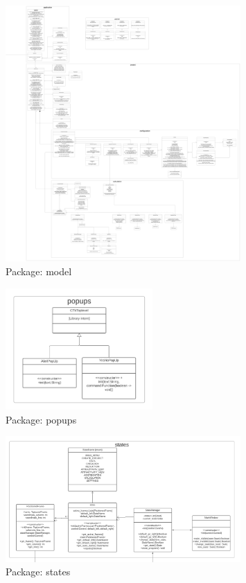 \documentclass[parskip=full]{scrartcl} %
\begin{document}
\hypertarget{model}{
\begin{figure}[hbt!]
  \centering
\includegraphics[width=0.8\textwidth]
        {pictures/model.png}
  \caption{Package: model}
  \label{fig:mvc}
\end{figure}
}

\hypertarget{popups}{
\begin{figure}[hbt!]
  \centering
\includegraphics[width=0.5\textwidth]
        {pictures/popups.png}
  \caption{Package: popups}
  \label{fig:mvc}
\end{figure}
}

\hypertarget{states}{
\begin{figure}[hbt!]
  \centering
\includegraphics[width=0.8\textwidth]
        {pictures/states.png}
  \caption{Package: states}
  \label{fig:mvc}
\end{figure}
}
\end{document}

